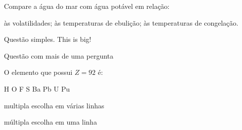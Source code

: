 \documentclass[a4paper,addpoints]{exam}
\begin{document}
\begin{multicols}{2}
\begin{questions}
{
\renewcommand*\thechoice{\alph{choice}} 
\renewcommand*\choicelabel{\thechoice)}
%
	Compare a água do mar com água potável em relação:
%	
\begin{choices}
	\choice às volatilidades;
	\choice às temperaturas de ebulição;
	\choice às temperaturas de congelação.
\end{choices}
}


	\question[20] Questão simples.
{\fontsize{0.1cm}{1em}\selectfont This is big!}




\addpoints
\makeemptybox{2cm}

\question[20] Questão com mais de uma pergunta
\noaddpoints %


\addpoints
\question[10] O elemento que possui $Z=92$ é:
\begin{multicols}{3}
	\begin{choices}
		\choice H
		\choice O
		\choice F
		\choice S
		\choice Ba
		\choice Pb
		\choice U
		\choice Pu 🐷
	\end{choices}
\end{multicols}

\question[10] multipla escolha em várias linhas
\begin{choices}
	\choice 1
	\choice 2
	\choice 3
	\choice 4
	\choice 5
\end{choices}

\question[10] múltipla escolha em uma linha\\
\begin{oneparchoices}
\end{oneparchoices}


\end{questions}
\end{multicols}
\end{document}

